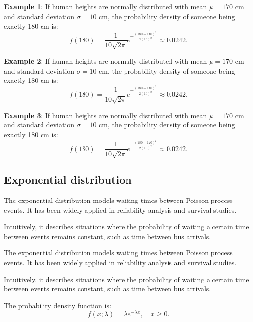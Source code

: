 \documentclass{book}
\begin{document}
\textbf{Example 1:} If human heights are normally distributed with mean $\mu=170$ cm and standard deviation $\sigma=10$ cm, the probability density of someone being exactly 180 cm is:
\begin{equation}
    f(180) = \frac{1}{10 \sqrt{2\pi}} e^{-\frac{(180-170)^2}{2(10)^2}} \approx 0.0242.
\end{equation}

\textbf{Example 2:} If human heights are normally distributed with mean $\mu=170$ cm and standard deviation $\sigma=10$ cm, the probability density of someone being exactly 180 cm is:
\begin{equation}
    f(180) = \frac{1}{10 \sqrt{2\pi}} e^{-\frac{(180-170)^2}{2(10)^2}} \approx 0.0242.
\end{equation}

\textbf{Example 3:} If human heights are normally distributed with mean $\mu=170$ cm and standard deviation $\sigma=10$ cm, the probability density of someone being exactly 180 cm is:
\begin{equation}
    f(180) = \frac{1}{10 \sqrt{2\pi}} e^{-\frac{(180-170)^2}{2(10)^2}} \approx 0.0242.
\end{equation}

\newpage
\subsection{Exponential distribution}
The exponential distribution models waiting times between Poisson process events. It has been widely applied in reliability analysis and survival studies.

Intuitively, it describes situations where the probability of waiting a certain time between events remains constant, such as time between bus arrivals.

The exponential distribution models waiting times between Poisson process events. It has been widely applied in reliability analysis and survival studies.

Intuitively, it describes situations where the probability of waiting a certain time between events remains constant, such as time between bus arrivals.

The probability density function is:
\begin{equation}
    f(x; \lambda) = \lambda e^{-\lambda x}, \quad x \geq 0.
\end{equation}
\end{document}
